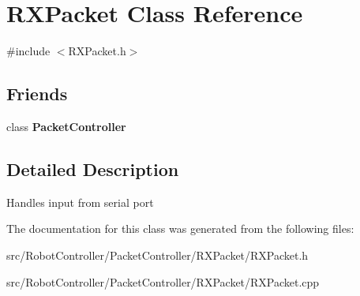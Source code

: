 \hypertarget{class_r_x_packet}{\section{R\+X\+Packet Class Reference}
\label{class_r_x_packet}
}


{\ttfamily \#include $<$R\+X\+Packet.\+h$>$}

\subsection*{Friends}
\begin{DoxyCompactItemize}
\item 
\hypertarget{class_r_x_packet_afcae7e144f5a566101e8a52106c0ba0a}{class {\bfseries Packet\+Controller}}\label{class_r_x_packet_afcae7e144f5a566101e8a52106c0ba0a}

\end{DoxyCompactItemize}


\subsection{Detailed Description}
Handles input from serial port 

The documentation for this class was generated from the following files\+:\begin{DoxyCompactItemize}
\item 
src/\+Robot\+Controller/\+Packet\+Controller/\+R\+X\+Packet/R\+X\+Packet.\+h\item 
src/\+Robot\+Controller/\+Packet\+Controller/\+R\+X\+Packet/R\+X\+Packet.\+cpp\end{DoxyCompactItemize}
